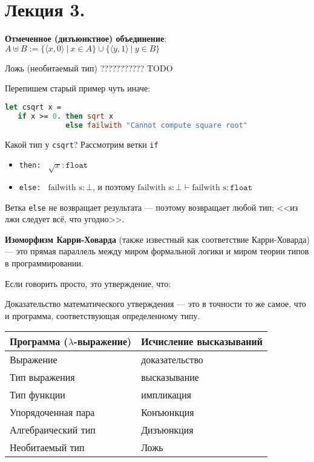 \section{Лекция 3.}







 \textbf{Отмеченное (дизъюнктное) объединение}: $A \uplus B := \{ \langle x, 0 \rangle\ |\ x \in A\} \cup \{ \langle y, 1\rangle\ |\ y \in B\}$

 Ложь (необитаемый тип) ??????????? TODO

Перепишем старый пример чуть иначе:
\begin{lstlisting}[language=Caml]
let csqrt x =
   if x >= 0. then sqrt x
              else failwith "Cannot compute square root"
\end{lstlisting}

Какой тип у \verb!csqrt!? Рассмотрим ветки \verb!if!
\begin{itemize}
\item \verb!then: ! $\sqrt x : \texttt{float}$
\item \verb!else: ! $\text{failwith s} : \bot$, и поэтому $\text{failwith s} : \bot \vdash \text{failwith s} : \texttt{float}$
\end{itemize}
Ветка \verb!else! не возвращает результата --- поэтому возвращает любой тип; <<из лжи следует всё, что угодно>>.



 \textbf{Изоморфизм Карри-Ховарда} (также известный как соответствие Карри-Ховарда) — это прямая параллель между миром формальной логики и миром теории типов в программировании.

Если говорить просто, это утверждение, что:

Доказательство математического утверждения — это в точности то же самое, что и программа, соответствующая определенному типу.
\begin{center}\begin{tabular}{ll}
Программа ($\lambda$-выражение) & Исчисление высказываний\\\hline
Выражение & доказательство\\
Тип выражения & высказывание\\
Тип функции & импликация\\
Упорядоченная пара & Конъюнкция\\
Алгебраический тип & Дизъюнкция\\
Необитаемый тип & Ложь
\end{tabular}\end{center}

